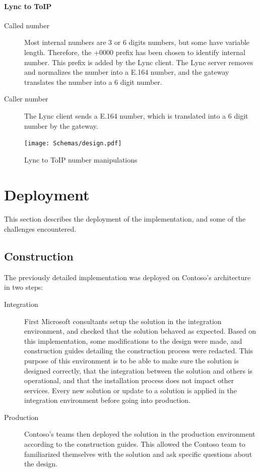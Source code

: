 	\paragraph{Lync to ToIP}
	\begin{description}
		\item[Called number] Most internal numbers are 3 or 6 digits numbers, but some have variable length. Therefore, the +0000 prefix has been chosen to identify internal number. This prefix is added by the Lync client. The Lync server removes and normalizes the number into a E.164 number, and the gateway translates the number into a 6 digit number.
		\item[Caller number] The Lync client sends a E.164 number, which is translated into a 6 digit number by the gateway.
	\end{description}
	\begin{figure}[H]
		\centering
		\texttt{[image: Schemas/design.pdf]}
		\caption{Lync to ToIP number manipulations}
		\label{fig:case_lync_to_toip}
	\end{figure}
	

\section{Deployment}

\paragraph{}
This section describes the deployment of the implementation, and some of the challenges encountered.

\subsection{Construction}
	The previously detailed implementation was deployed on Contoso's architecture in two steps: 
	\begin{description}
		\item[Integration] First Microsoft consultants setup the solution in the integration environment, and checked that the solution behaved as expected. Based on this implementation, some modifications to the design were made, and construction guides detailing the construction process were redacted. This purpose of this environment is to be able to make sure the solution is designed correctly, that the integration between the solution and others is operational, and that the installation process does not impact other services. Every new solution or update to a solution is applied in the integration environment before going into production. 
		
		\item[Production] Contoso's teams then deployed the solution in the production environment according to the construction guides. This allowed the Contoso team to familiarized themselves with the solution and ask specific questions about the design.
	\end{description}


